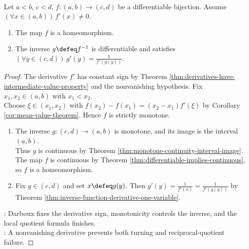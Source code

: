 \begin{corollary} \label{cor:one-dimensional-inverse-function-theorem} \\
Let $a<b$, $c<d$, $f:(a,b)\to(c,d)$ be a differentiable bijection. Assume $(\forall x\in(a,b))\,f'(x)\neq0$.
\begin{enumerate}[label=(\roman*)]
\setlength{\itemsep}{0pt}
\item The map $f$ is a homeomorphism.
\item The inverse $g\defeq f^{-1}$ is differentiable and satisfies $(\forall y\in(c,d))\,g'(y)=\frac{1}{f'(g(y))}$.
\end{enumerate}
\begin{proof}
The derivative $f'$ has constant sign by Theorem \ref{thm:derivatives-have-intermediate-value-property} and the nonvanishing hypothesis. Fix $x_1,x_2\in(a,b)$ with $x_1<x_2$.\\
Choose $\xi\in(x_1,x_2)$ with $f(x_2)-f(x_1)=(x_2-x_1)f'(\xi)$ by Corollary \ref{cor:mean-value-theorem}. Hence $f$ is strictly monotone.
\begin{enumerate}[label=(\roman*)]
\setlength{\itemsep}{0pt}
\item The inverse $g:(c,d)\to(a,b)$ is monotone, and its image is the interval $(a,b)$.\\
Thus $g$ is continuous by Theorem \ref{thm:monotone-continuity-interval-image}. The map $f$ is continuous by Theorem \ref{thm:differentiable-implies-continuous}, so $f$ is a homeomorphism.
\item Fix $y\in(c,d)$ and set $x\defeq g(y)$. Then $g'(y)=\frac{1}{f'(x)}=\frac{1}{f'(g(y))}$ by Theorem \ref{thm:inverse-function-derivative-one-variable}.
\end{enumerate}
: Darboux fixes the derivative sign, monotonicity controls the inverse, and the local quotient formula finishes.\\
: A nonvanishing derivative prevents both turning and reciprocal-quotient failure.
\end{proof}
\end{corollary}

